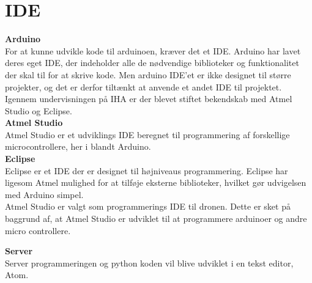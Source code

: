 \section{IDE}

\textbf{Arduino} \\
For at kunne udvikle kode til arduinoen, kræver det et IDE. Arduino har lavet deres eget IDE, der indeholder alle de nødvendige biblioteker og funktionalitet der skal til for at skrive kode. Men arduino IDE'et er ikke designet til større projekter, og det er derfor tiltænkt at anvende et andet IDE til projektet. 
Igennem undervisningen på IHA er der blevet stiftet bekendskab med Atmel Studio og Eclipse. \\

\textbf{Atmel Studio} \\
Atmel Studio er et udviklings IDE beregnet til programmering af forskellige microcontrollere, her i blandt Arduino. \\
\textbf{Eclipse} \\
Eclipse er et IDE der er designet til højniveaus programmering. Eclipse har ligesom Atmel mulighed for at tilføje eksterne biblioteker, hvilket gør udvigelsen med Arduino simpel. \\

Atmel Studio er valgt som programmerings IDE til dronen. Dette er sket på baggrund af, at Atmel Studio er udviklet til at programmere arduinoer og andre micro controllere.



\textbf{Server} \\
Server programmeringen og python koden vil blive udviklet i en tekst editor, Atom.  